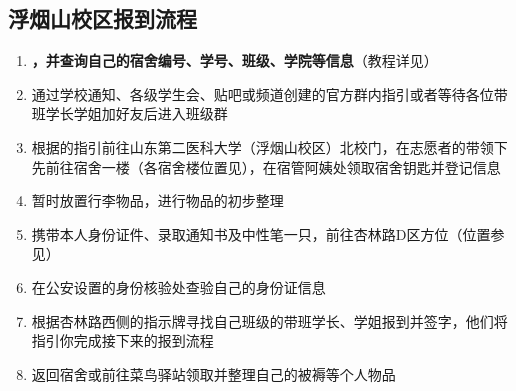 \subsection[浮烟山校区报到流程]{浮烟山校区报到流程}
\begin{enumerate}
    \item \textbf{，并查询自己的宿舍编号、学号、班级、学院等信息}\footnotemark（教程详见）
    \item 通过学校通知、各级学生会、贴吧或频道创建的官方群内指引或者等待各位带班学长学姐加好友后进入班级群\footnotemark
    \item 根据的指引前往山东第二医科大学（浮烟山校区）北校门，在志愿者\footnotemark 的带领下先前往宿舍一楼（各宿舍楼位置见），在宿管阿姨处领取宿舍钥匙并登记信息
    \item 暂时放置行李物品，进行物品的初步整理
    \item 携带本人身份证件、录取通知书\footnotemark 及中性笔一只，前往杏林路D区方位（位置参见）
    \item 在公安设置的身份核验处查验自己的身份证\footnotemark 信息
    \item 根据杏林路西侧的指示牌寻找自己班级的带班学长、学姐报到并签字，他们将指引你完成接下来的报到流程\footnotemark
    \item 返回宿舍或前往菜鸟驿站领取并整理自己的被褥等个人物品
\end{enumerate}